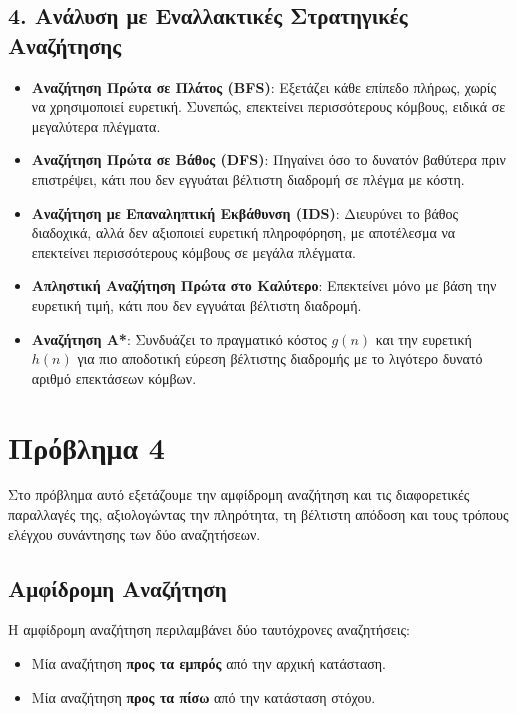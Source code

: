 \documentclass{article}
\begin{document}
\subsection*{4. Ανάλυση με Εναλλακτικές Στρατηγικές Αναζήτησης}

\begin{itemize}
    \item \textbf{Αναζήτηση Πρώτα σε Πλάτος (BFS)}: Εξετάζει κάθε επίπεδο πλήρως, χωρίς να χρησιμοποιεί ευρετική. Συνεπώς, επεκτείνει περισσότερους κόμβους, ειδικά σε μεγαλύτερα πλέγματα.
    \item \textbf{Αναζήτηση Πρώτα σε Βάθος (DFS)}: Πηγαίνει όσο το δυνατόν βαθύτερα πριν επιστρέψει, κάτι που δεν εγγυάται βέλτιστη διαδρομή σε πλέγμα με κόστη.
    \item \textbf{Αναζήτηση με Επαναληπτική Εκβάθυνση (IDS)}: Διευρύνει το βάθος διαδοχικά, αλλά δεν αξιοποιεί ευρετική πληροφόρηση, με αποτέλεσμα να επεκτείνει περισσότερους κόμβους σε μεγάλα πλέγματα.
    \item \textbf{Απληστική Αναζήτηση Πρώτα στο Καλύτερο}: Επεκτείνει μόνο με βάση την ευρετική τιμή, κάτι που δεν εγγυάται βέλτιστη διαδρομή.
    \item \textbf{Αναζήτηση A*}: Συνδυάζει το πραγματικό κόστος \( g(n) \) και την ευρετική \( h(n) \) για πιο αποδοτική εύρεση βέλτιστης διαδρομής με το λιγότερο δυνατό αριθμό επεκτάσεων κόμβων.
\end{itemize}

\section*{Πρόβλημα 4}

Στο πρόβλημα αυτό εξετάζουμε την αμφίδρομη αναζήτηση και τις διαφορετικές παραλλαγές της, αξιολογώντας την πληρότητα, τη βέλτιστη απόδοση και τους τρόπους ελέγχου συνάντησης των δύο αναζητήσεων.

\subsection*{Αμφίδρομη Αναζήτηση}

Η αμφίδρομη αναζήτηση περιλαμβάνει δύο ταυτόχρονες αναζητήσεις:

\begin{itemize}
    \item Μία αναζήτηση \textbf{προς τα εμπρός} από την αρχική κατάσταση.
    \item Μία αναζήτηση \textbf{προς τα πίσω} από την κατάσταση στόχου.
\end{itemize}
\end{document}
